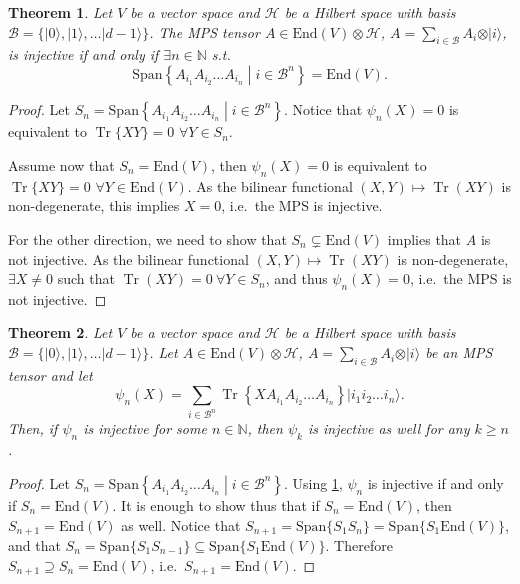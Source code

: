 \documentclass{article}
\newtheorem{theorem}{Theorem}
\newcommand{\tr}{\operatorname{Tr}}
\newcommand{\End}{\mathrm{End}}
\newcommand{\ket}[1]{\vert #1 \rangle}
\newcommand{\Span}{\mathrm{Span}}
\begin{document}
\begin{theorem}\label{thm:injectivity_equivalent}
  Let $V$ be a vector space and $\mathcal{H}$ be a Hilbert space with basis $\mathcal{B} = \{\ket{0},\ket{1},\dots \ket{d-1}\}$. The MPS tensor $A\in \End(V)\otimes \mathcal{H}$, $A = \sum_{i\in \mathcal{B}} A_i \otimes \ket{i}$, is injective if and only if $\exists n\in \mathbb{N}$ s.t.
  \begin{equation*}
  	\Span\left\{A_{i_1} A_{i_2} \dots A_{i_n} \middle| i\in \mathcal{B}^n \right\} = \End(V).
  \end{equation*}
\end{theorem}

\begin{proof}
	Let $S_n = \Span\left\{A_{i_1} A_{i_2} \dots A_{i_n} \middle| i\in \mathcal{B}^n \right\}$. Notice that $\psi_n(X)=0$ is equivalent to $\tr\{XY\} = 0$ $\forall Y\in S_n$.
  
  Assume now that $S_n = \End(V)$, then $\psi_n(X) = 0$ is equivalent to $\tr \{XY\} = 0 $ $\forall Y\in \End(V)$. As the bilinear functional $(X,Y)\mapsto \tr (XY)$ is non-degenerate, this implies $X=0$, i.e.\ the MPS is injective.
  
  For the other direction, we need to show that $S_n\subsetneq \End(V)$ implies that $A$ is not injective. As the bilinear functional $(X,Y)\mapsto \tr (XY)$ is non-degenerate, $\exists X\neq 0$ such that $\tr (XY) = 0 \ \forall Y\in S_n$, and thus $\psi_n(X) = 0$, i.e.\ the MPS is not injective.
\end{proof}


\begin{theorem}
  Let $V$ be a vector space and $\mathcal{H}$ be a Hilbert space with basis $\mathcal{B} = \{\ket{0},\ket{1},\dots \ket{d-1}\}$. Let $A\in \End(V)\otimes \mathcal{H}$, $A = \sum_{i\in \mathcal{B}} A_i \otimes \ket{i}$ be an MPS tensor and let
  \begin{equation*}
    \psi_n(X) = \sum_{i\in \mathcal{B}^n} \tr\left\{XA_{i_1} A_{i_2} \dots A_{i_n}\right\} \ket{i_1 i_2 \dots i_n}.
  \end{equation*}
  Then, if $\psi_n$ is injective for some $n\in\mathbb{N}$, then $\psi_k$ is injective as well for any $k\geq n$.
\end{theorem}

\begin{proof}
  Let $S_n = \Span\left\{A_{i_1} A_{i_2} \dots A_{i_n} \middle| i\in \mathcal{B}^n \right\}$. Using \cref{thm:injectivity_equivalent}, $\psi_n$ is injective if and only if $S_n = \End(V)$. It is enough to show thus that if $S_n = \End(V)$, then $S_{n+1} = \End(V)$ as well. Notice that $S_{n+1} = \Span\{S_1 S_n\} = \Span\{ S_1 \End(V)\}$, and that $S_{n} = \Span\{S_1 S_{n-1}\} \subseteq \Span\{S_1 \End(V)\}$. Therefore $S_{n+1} \supseteq S_n = \End(V)$, i.e.\ $S_{n+1} = \End(V)$. 
\end{proof}
\end{document}
